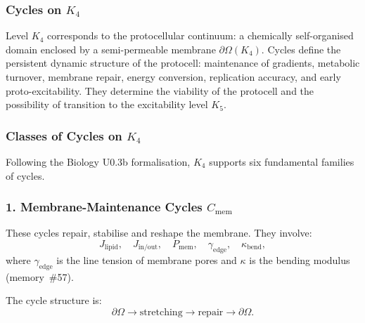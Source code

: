 
\subsubsection{Cycles on \texorpdfstring{$K_4$}{K_4}}
\label{sec:cycles-k4}

Level $K_4$ corresponds to the protocellular continuum: 
a chemically self-organised domain enclosed by a semi-permeable
membrane $\partial\Omega(K_4)$.
Cycles define the persistent dynamic structure of the protocell:
maintenance of gradients, metabolic turnover, membrane repair,
energy conversion, replication accuracy, and early proto-excitability.
They determine the viability of the protocell and the possibility
of transition to the excitability level $K_5$.

\subsubsection{Classes of Cycles on \texorpdfstring{$K_4$}{K_4}}

Following the Biology U0.3b formalisation, $K_4$ supports six
fundamental families of cycles.

\subsubsection{1. Membrane-Maintenance Cycles $C_{\mathrm{mem}}$}

These cycles repair, stabilise and reshape the membrane.
They involve:
\[
  J_{\mathrm{lipid}},\quad
  J_{\mathrm{in/out}},\quad
  P_{\mathrm{mem}},\quad
  \gamma_{\mathrm{edge}},\quad
  \kappa_{\mathrm{bend}},
\]
where $\gamma_{\mathrm{edge}}$ is the line tension of membrane pores
and $\kappa$ is the bending modulus (memory~\#57).

The cycle structure is:
\[
  \partial\Omega \to 
  \mathrm{stretching} \to 
  \mathrm{repair} \to 
  \partial\Omega.
\]

